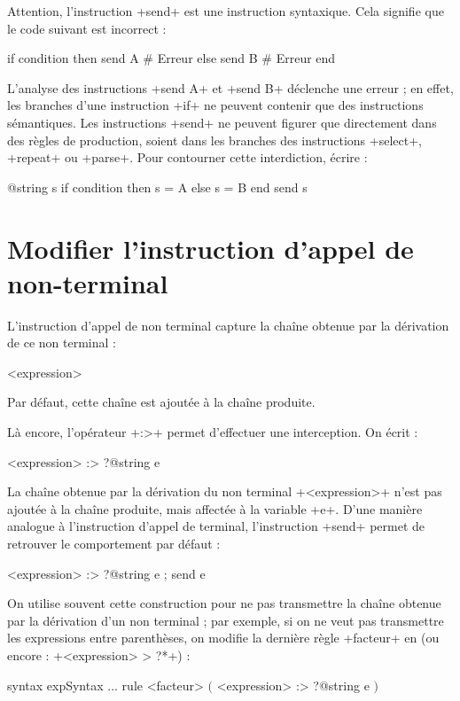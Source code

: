 Attention, l'instruction \ggs+send+ est une instruction syntaxique. Cela signifie que le code suivant est incorrect :

\begin{galgascode}
if condition then
  send A # Erreur
else
  send B # Erreur
end
\end{galgascode}

L'analyse des instructions \ggs+send A+ et  \ggs+send B+ déclenche une erreur ; en effet, les branches d'une instruction \ggs+if+ ne peuvent contenir que des instructions sémantiques. Les instructions \ggs+send+ ne peuvent figurer que directement dans des règles de production, soient dans les branches des instructions \ggs+select+, \ggs+repeat+ ou \ggs+parse+. Pour contourner cette interdiction, écrire :
\begin{galgascode}
@string s
if condition then
  s = A
else
  s = B
end
send s
\end{galgascode}



\section{Modifier l'instruction d'appel de non-terminal}

L'instruction d'appel de non terminal capture la chaîne obtenue par la dérivation de ce non terminal :
\begin{galgascode}
<expression>
\end{galgascode}


Par défaut, cette chaîne est ajoutée à la chaîne produite.

Là encore, l'opérateur \ggs+:>+ permet d'effectuer une interception. On écrit :
\begin{galgascode}
<expression> :> ?@string e
\end{galgascode}

La chaîne obtenue par la dérivation du non terminal \ggs+<expression>+ n'est pas ajoutée à la chaîne produite, mais affectée à la variable \ggs+e+. D'une manière analogue à l'instruction d'appel de terminal, l'instruction \ggs+send+ permet de retrouver le comportement par défaut :
\begin{galgascode}
<expression> :> ?@string e ; send e
\end{galgascode}

On utilise souvent cette construction pour ne pas transmettre la chaîne obtenue par la dérivation d'un non terminal ; par exemple, si on ne veut pas transmettre les expressions entre parenthèses, on modifie la dernière règle \ggs+facteur+ en (ou encore : \ggs+<expression> \:> ?*+) :
\begin{galgascode}
syntax expSyntax {
  ...
  rule <facteur> {
    $($
    <expression> :> ?@string e
    $)$
  }
}
\end{galgascode}


